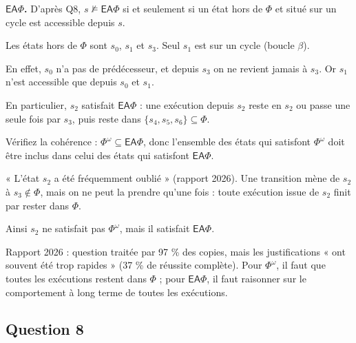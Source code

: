 \documentclass[11pt,a4paper]{article}
\newcommand{\equationajustee}[1]{%
  \sbox{\boiteequation}{$\displaystyle #1$}%
  \ifdim\wd\boiteequation>\linewidth
    \[\resizebox{\linewidth}{!}{\usebox{\boiteequation}}\]%
  \else
    \[#1\]%
  \fi}
\begin{document}
\equationajustee{\boxed{s\models\Phi^\omega\iff s\in\{s_4,s_5,s_6\}}}

\textbf{\(\mathsf{EA}\Phi\).} D'après Q8, \(s\not\models\mathsf{EA}\Phi\) si et seulement si un état hors de \(\Phi\) et situé sur un cycle est accessible depuis \(s\).

Les états hors de \(\Phi\) sont \(s_0\), \(s_1\) et \(s_3\). Seul \(s_1\) est sur un cycle (boucle \(\beta\)).

En effet, \(s_0\) n'a pas de prédécesseur, et depuis \(s_3\) on ne revient jamais à \(s_3\). Or \(s_1\) n'est accessible que depuis \(s_0\) et \(s_1\).

En particulier, \(s_2\) satisfait \(\mathsf{EA}\Phi\) : une exécution depuis \(s_2\) reste en \(s_2\) ou passe une seule fois par \(s_3\), puis reste dans \(\{s_4,s_5,s_6\}\subseteq\Phi\).

\equationajustee{\boxed{s\models\mathsf{EA}\Phi\iff s\in\{s_2,s_3,s_4,s_5,s_6\}}}

\begin{methode}

Vérifiez la cohérence : \(\Phi^\omega\subseteq\mathsf{EA}\Phi\), donc l'ensemble des états qui satisfont \(\Phi^\omega\) doit être inclus dans celui des états qui satisfont \(\mathsf{EA}\Phi\).

\end{methode}

\begin{piege}

« L'état \(s_2\) a été fréquemment oublié » (rapport 2026). Une transition mène de \(s_2\) à \(s_3\notin\Phi\), mais on ne peut la prendre qu'une fois : toute exécution issue de \(s_2\) finit par rester dans \(\Phi\).

Ainsi \(s_2\) ne satisfait pas \(\Phi^\omega\), mais il satisfait \(\mathsf{EA}\Phi\).

\end{piege}

\begin{jury}

Rapport 2026 : question traitée par 97 \% des copies, mais les justifications « ont souvent été trop rapides » (37 \% de réussite complète). Pour \(\Phi^\omega\), il faut que toutes les exécutions restent dans \(\Phi\) ; pour \(\mathsf{EA}\Phi\), il faut raisonner sur le comportement à long terme de toutes les exécutions.

\end{jury}

\hypertarget{question-8}{%
\subsection{Question 8}\label{question-8}}
\end{document}
